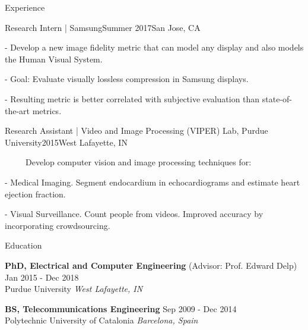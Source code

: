 \documentclass{resume} %
\begin{document}
\begin{rSection}{Experience}
\begin{rSubsection}{Research Intern | Samsung}{Summer 2017}{}{San Jose, CA}
\setlength{\itemindent}{.3in}
\item[-] Develop a new image fidelity metric that can model any display and also models the Human Visual System.
\item[-] Goal: Evaluate visually lossless compression in Samsung displays.
\item[-] Resulting metric is better correlated with subjective evaluation than state-of-the-art metrics.
\end{rSubsection}

\begin{rSubsection}{Research Assistant | Video and Image Processing (VIPER) Lab, Purdue University}{2015}{}{West Lafayette, IN}
\item[]~~~~~Develop computer vision and image processing techniques for:
\setlength{\itemindent}{.3in}
\item[-] Medical Imaging. Segment endocardium in echocardiograms and estimate heart ejection fraction.
\item[-] Visual Surveillance. Count people from videos. Improved accuracy by incorporating crowdsourcing.
\end{rSubsection}

\vspace{-1pt}

\end{rSection}


\vspace{-5pt}
\begin{rSection}{Education}

{\bf PhD, Electrical and Computer Engineering} ({\normalfont Advisor}: Prof. Edward Delp) \hfill {Jan 2015 - Dec 2018} \\
Purdue University \hfill {\em West Lafayette, IN\\}


{\bf BS, Telecommunications Engineering} \hfill {Sep 2009 - Dec 2014} \\ 
Polytechnic University of Catalonia \hfill {\em Barcelona, Spain}

\vspace{-1pt}

\end{rSection}
\end{document}
